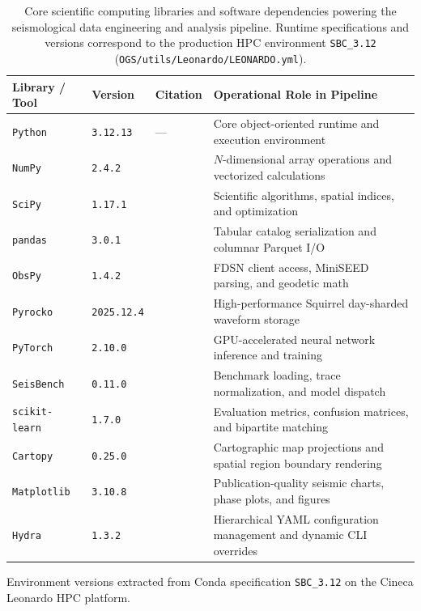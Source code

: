\begin{table}[htbp]
  \centering
  \small
  \caption{Core scientific computing libraries and software dependencies
    powering the seismological data engineering and analysis pipeline.
    Runtime specifications and versions correspond to the production \ac{HPC}
    environment \texttt{SBC\_3.12} (\texttt{OGS/utils/Leonardo/LEONARDO.yml}).
  }
  \label{tab:software_ecosystem}
  \begin{threeparttable}
    \begin{tabularx}{\linewidth}{l l l X}
      \toprule
      \textbf{Library / Tool} & \textbf{Version\tnote{a}} &
      \textbf{Citation} & \textbf{Operational Role in Pipeline} \\
      \midrule
      \texttt{Python} & \texttt{3.12.13} & --- & Core
      object-oriented runtime and execution environment \\
      \texttt{NumPy} & \texttt{2.4.2} & \textcite{NumPy} &
      $N$-dimensional array operations and vectorized calculations \\
      \texttt{SciPy} & \texttt{1.17.1} & \textcite{SciPy} &
      Scientific algorithms, spatial indices, and optimization \\
      \texttt{pandas} & \texttt{3.0.1} & \textcite{pandas} & Tabular
      catalog serialization and columnar Parquet I/O \\
      \texttt{ObsPy} & \texttt{1.4.2} & \textcite{ObsPy} & FDSN
      client access, MiniSEED parsing, and geodetic math \\
      \texttt{Pyrocko} & \texttt{2025.12.4} & \textcite{Pyrocko} &
      High-performance Squirrel day-sharded waveform storage \\
      \texttt{PyTorch} & \texttt{2.10.0} & \textcite{PyTorch} &
      GPU-accelerated neural network inference and training \\
      \texttt{SeisBench} & \texttt{0.11.0} & \textcite{SeisBench} &
      Benchmark loading, trace normalization, and model dispatch \\
      \texttt{scikit-learn} & \texttt{1.7.0} &
      \textcite{scikit-learn} & Evaluation metrics, confusion
      matrices, and bipartite matching \\
      \texttt{Cartopy} & \texttt{0.25.0} & \textcite{Cartopy} &
      Cartographic map projections and spatial region boundary rendering \\
      \texttt{Matplotlib} & \texttt{3.10.8} & \textcite{Matplotlib}
      & Publication-quality seismic charts, phase plots, and figures \\
      \texttt{Hydra} & \texttt{1.3.2} & \textcite{Hydra} &
      Hierarchical YAML configuration management and dynamic CLI overrides \\
      \bottomrule
    \end{tabularx}
    \begin{tablenotes}[flushleft]
    \item[a] Environment versions extracted from Conda specification
      \texttt{SBC\_3.12} on the Cineca Leonardo HPC platform.
    \end{tablenotes}
  \end{threeparttable}
\end{table}

